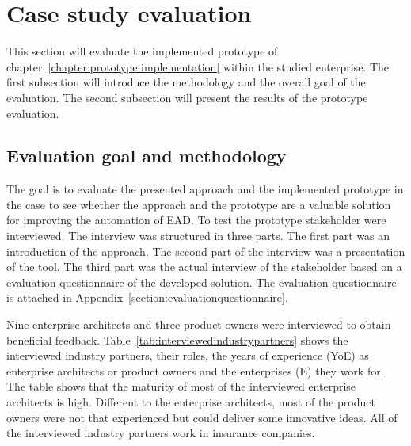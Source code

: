 \section{Case study evaluation}\label{section:solutionarchitecture}

This section will evaluate the implemented prototype of chapter~\ref{chapter:prototype implementation} within the studied enterprise. The first subsection will introduce the methodology and the overall goal of the evaluation. The second subsection will present the results of the prototype evaluation.

\subsection{Evaluation goal and methodology}


The goal is to evaluate the presented approach and the implemented prototype in the case to see whether the approach and the prototype are a valuable solution for improving the automation of EAD. To test the prototype stakeholder were interviewed. The interview was structured in three parts. The first part was an introduction of the approach. The second part of the interview was a presentation of the tool. The third part was the actual interview of the stakeholder based on a evaluation questionnaire of the developed solution. The evaluation questionnaire is attached in Appendix~\ref{section:evaluationquestionnaire}. 

Nine enterprise architects and three product owners were interviewed to obtain beneficial feedback. Table~\ref{tab:interviewedindustrypartners} shows the interviewed industry partners, their roles, the years of experience (YoE) as enterprise architects or product owners and the enterprises (E) they work for. The table shows that the maturity of most of the interviewed enterprise architects is high. Different to the enterprise architects, most of the product owners were not that experienced but could deliver some innovative ideas.
All of the interviewed industry partners work in insurance companies.

